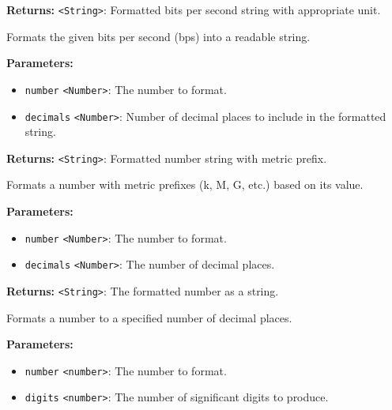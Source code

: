 \documentclass[12pt,a4paper]{article}
\begin{document}
\noindent \textbf{Returns:} \texttt{<String>}: Formatted bits per second string with appropriate unit.

\noindent Formats the given bits per second (bps) into a readable string.

\vspace{5mm}
\noindent {}


\noindent \textbf{Parameters:}
\begin{itemize}
  \item \texttt{number} \texttt{<Number>}: The number to format.
  \item \texttt{decimals} \texttt{<Number>}: Number of decimal places to include in the formatted string.
\end{itemize}

\noindent \textbf{Returns:} \texttt{<String>}: Formatted number string with metric prefix.

\noindent Formats a number with metric prefixes (k, M, G, etc.) based on its value.

\vspace{5mm}
\noindent {}


\noindent \textbf{Parameters:}
\begin{itemize}
  \item \texttt{number} \texttt{<Number>}: The number to format.
  \item \texttt{decimals} \texttt{<Number>}: The number of decimal places.
\end{itemize}

\noindent \textbf{Returns:} \texttt{<String>}: The formatted number as a string.

\noindent Formats a number to a specified number of decimal places.

\vspace{5mm}
\noindent {}


\noindent \textbf{Parameters:}
\begin{itemize}
  \item \texttt{number} \texttt{<number>}: The number to format.
  \item \texttt{digits} \texttt{<number>}: The number of significant digits to produce.
\end{itemize}
\end{document}

